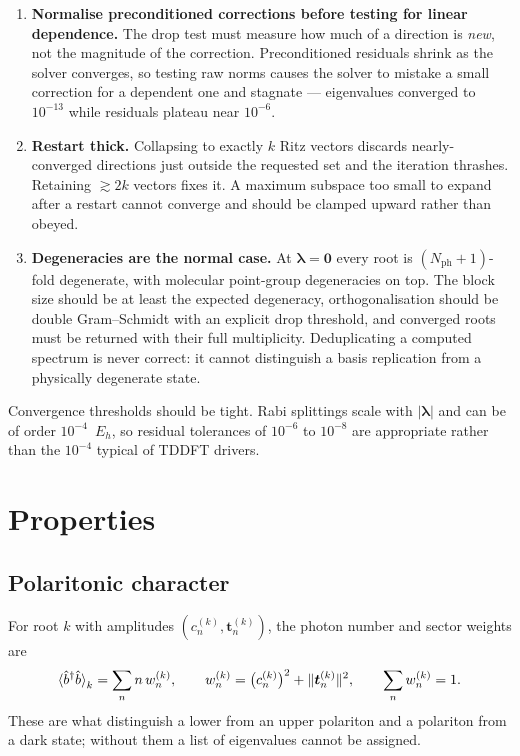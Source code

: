 \documentclass[11pt]{article}
\newcommand{\lam}{\bm{\lambda}}
\newcommand{\nph}{N_{\mathrm{ph}}}
\newcommand{\bd}{\hat{b}^{\dagger}}
\newcommand{\bo}{\hat{b}}
\begin{document}
\begin{enumerate}[leftmargin=1.6em, itemsep=3pt]
\item \textbf{Normalise preconditioned corrections before testing for linear
dependence.} The drop test must measure how much of a direction is \emph{new},
not the magnitude of the correction. Preconditioned residuals shrink as the
solver converges, so testing raw norms causes the solver to mistake a small
correction for a dependent one and stagnate --- eigenvalues converged to
$10^{-13}$ while residuals plateau near $10^{-6}$.
\item \textbf{Restart thick.} Collapsing to exactly $k$ Ritz vectors discards
nearly-converged directions just outside the requested set and the iteration
thrashes. Retaining $\gtrsim 2k$ vectors fixes it. A maximum subspace too small
to expand after a restart cannot converge and should be clamped upward rather
than obeyed.
\item \textbf{Degeneracies are the normal case.} At $\lam = \bm{0}$ every root
is $(\nph+1)$-fold degenerate, with molecular point-group degeneracies on top.
The block size should be at least the expected degeneracy, orthogonalisation
should be double Gram--Schmidt with an explicit drop threshold, and converged
roots must be returned with their full multiplicity. Deduplicating a computed
spectrum is never correct: it cannot distinguish a basis replication from a
physically degenerate state.
\end{enumerate}

Convergence thresholds should be tight. Rabi splittings scale with $|\lam|$ and
can be of order $10^{-4}$~$E_h$, so residual tolerances of $10^{-6}$ to
$10^{-8}$ are appropriate rather than the $10^{-4}$ typical of TDDFT drivers.

\section{Properties}

\subsection{Polaritonic character}

For root $k$ with amplitudes $(c_n^{(k)}, \bm{t}_n^{(k)})$, the photon number and
sector weights are
\begin{equation}
\braket{\bd\bo}_k = \sum_{n} n\,w_n^{(k)},
\qquad
w_n^{(k)} = \bigl(c_n^{(k)}\bigr)^2 + \lVert \bm{t}_n^{(k)} \rVert^2 ,
\qquad \sum_n w_n^{(k)} = 1 .
\end{equation}
These are what distinguish a lower from an upper polariton and a polariton from
a dark state; without them a list of eigenvalues cannot be assigned.
\end{document}
